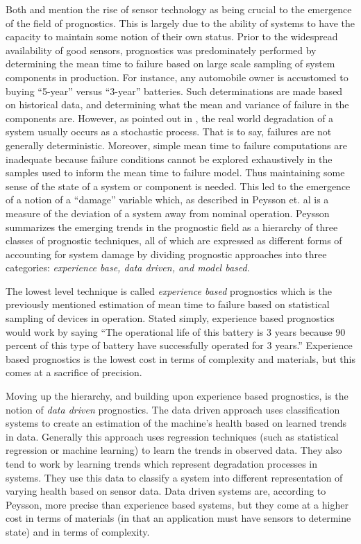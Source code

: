 \documentclass[12pt]{article}
\begin{document}
Both \cite{877920} and \cite{4585821} mention the rise of sensor technology as
being crucial to the emergence of the field of prognostics.  This is largely
due to the ability of systems to have the capacity to maintain some notion of
their own status.  Prior to the widespread availability of good sensors,
prognostics was predominately performed by determining the mean time to failure
based on large scale sampling of system components in production.  For
instance, any automobile owner is accustomed to buying ``5-year'' versus
``3-year'' batteries.  Such determinations are made based on historical data,
and determining what the mean and variance of failure in the components are.
However, as pointed out in \cite{4711428}, the real world degradation of a
system usually occurs as a stochastic process.  That is to say, failures are
not generally deterministic.  Moreover, simple mean time to failure
computations are inadequate because failure conditions cannot be explored
exhaustively in the samples used to inform the mean time to failure model.  Thus
maintaining some sense of the state of a system or component is needed.  This
led to the emergence of a notion of a ``damage'' variable which, as described
in Peysson et. al \cite{4711428} is a measure of the deviation of a system away
from nominal operation.  Peysson summarizes the emerging trends in the
prognostic field as a hierarchy of three classes of prognostic techniques, all
of which are expressed as different forms of accounting for system damage by
dividing prognostic approaches into three categories: {\em experience base,
  data driven, and model based}.  

The lowest level technique is called {\em experience based} prognostics which
is the previously mentioned estimation of mean time to failure based on
statistical sampling of devices in operation.  Stated simply, experience based
prognostics would work by saying ``The operational life of this battery is 3
years because 90 percent of this type of battery have successfully operated for
3 years.''  Experience based prognostics is the lowest cost in terms of
complexity and materials, but this comes at a sacrifice of precision.  

Moving up the hierarchy, and building upon experience based prognostics, is the
notion of {\em data driven} prognostics.  The data driven approach uses
classification systems to create an estimation of the machine's health based on
learned trends in data.  Generally this approach uses regression techniques
(such as statistical regression or machine learning) to learn the trends in
observed data.  They also tend to work by learning trends which represent
degradation processes in systems.  They use this data to classify a system into
different representation of varying health based on sensor data.  Data driven
systems are, according to Peysson, more precise than experience based systems,
but they come at a higher cost in terms of materials (in that an application
must have sensors to determine state) and in terms of complexity.  
\end{document}
